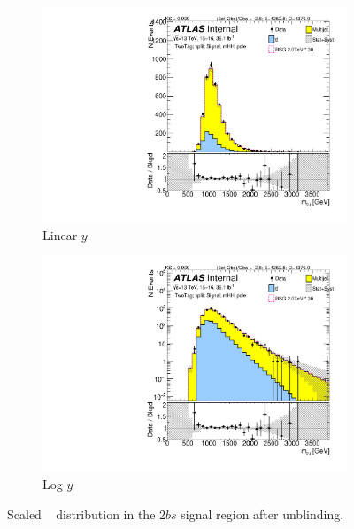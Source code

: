 \begin{figure}[htb!]
\begin{center}
    \captionsetup{justification=centering}
    \begin{subfigure}[b]{0.45\textwidth}
        \includegraphics[width=\textwidth,angle=-90]{figures/boosted/Signal_Syst/Moriond_bkg_9_TwoTag_split_Signal_mHH_pole.pdf}
        \caption{Linear-$y$}
        \label{fig:boosted-2b-signal-pole-lin}
    \end{subfigure}
    \quad
    \begin{subfigure}[b]{0.45\textwidth}
        \includegraphics[width=\textwidth,angle=-90]{figures/boosted/Signal_Syst/Moriond_bkg_9_TwoTag_split_Signal_mHH_pole_1.pdf}
        \caption{Log-$y$}
        \label{fig:boosted-2b-signal-pole-log}
    \end{subfigure}
  \caption{Scaled \mtwoJ~ distribution in the $2bs$ signal region after unblinding.}
  \label{fig:boosted-2b-signal-pole}
\end{center}
\end{figure}

